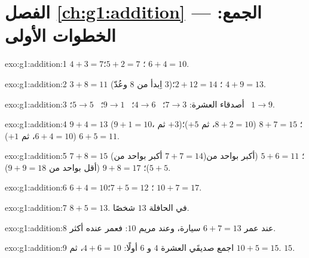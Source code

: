 \section*{الفصل \ref{ch:g1:addition} --- الجمع: الخطوات الأولى}

\begin{solution}{exo:g1:addition:1}
$4 + 3 = 7$؛ \quad $5 + 2 = 7$؛ \quad $6 + 4 = 10$.
\end{solution}

\begin{solution}{exo:g1:addition:2}
$3 + 8 = 11$ (اِبدأ من $8$ وعُدّ $3$)؛ \quad
$2 + 12 = 14$؛ \quad $4 + 9 = 13$.
\end{solution}

\begin{solution}{exo:g1:addition:3}
أصدقاء العشرة: $7 \to 3$؛ \ $4 \to 6$؛ \ $9 \to 1$؛ \ $5 \to 5$؛
\ $1 \to 9$.
\end{solution}

\begin{solution}{exo:g1:addition:4}
$9 + 4 = 13$ ($9 + 1 = 10$، ثم $+3$)؛ \quad
$8 + 7 = 15$ ($8 + 2 = 10$، ثم $+5$)؛ \quad
$6 + 5 = 11$ ($6 + 4 = 10$، ثم $+1$).
\end{solution}

\begin{solution}{exo:g1:addition:5}
$7 + 8 = 15$ (أكبر بواحد من $7 + 7 = 14$)؛ \quad
$5 + 6 = 11$ (أكبر بواحد من $5 + 5$)؛ \quad
$9 + 8 = 17$ (أقل بواحد من $9 + 9 = 18$).
\end{solution}

\begin{solution}{exo:g1:addition:6}
$6 + 4 = 10$؛ \quad $7 + 5 = 12$؛ \quad $10 + 7 = 17$.
\end{solution}

\begin{solution}{exo:g1:addition:7}
$8 + 5 = 13$. في الحافلة $13$ شخصًا.
\end{solution}

\begin{solution}{exo:g1:addition:8}
عند عمر $6 + 7 = 13$ سيارة، وعند مريم $10$: فعمر عنده أكثر.
\end{solution}

\begin{solution}{exo:g1:addition:9}
اجمع صديقَي العشرة $4$ و $6$ أولًا: $4 + 6 = 10$، ثم
$10 + 5 = 15$.  $15$.
\end{solution}
